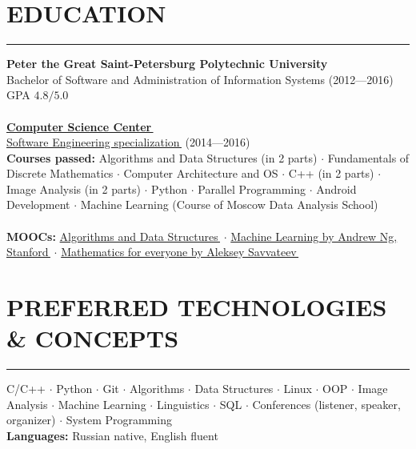 \documentclass[11pt]{res} %
\let\orighref\href
\renewcommand{\href}[2]{\orighref{#1}{#2\,\faExternalLink}}
\begin{document}
\begin{resume}
\section{\uppercase{Education}} 
\begin{spacing}{0.3}
\textcolor[RGB]{220,220,220}{\rule{\linewidth}{0.4pt}} 
\end{spacing}
\noindent \textbf{Peter the Great Saint-Petersburg Polytechnic University} \\
Bachelor of Software and Administration of Information Systems (2012---2016) \\
GPA $4.8/5.0$ \\ \\ 
\textbf{\href{https://compscicenter.ru/about/}{Computer Science Center}} \\
\href{https://compscicenter.ru/users/801/}{Software Engineering specialization} (2014---2016) \\
\textbf{Courses passed:} Algorithms and Data Structures (in 2 parts) $\cdot$ Fundamentals of Discrete Mathematics $\cdot$ Computer Architecture and OS $\cdot$ C++ (in 2 parts) $\cdot$ Image Analysis (in 2 parts) $\cdot$ Python $\cdot$ Parallel Programming $\cdot$ Android Development $\cdot$ Machine Learning (Course of Moscow Data Analysis School) \\ \\ 
\noindent \textbf{MOOCs:} \href{https://stepik.org/certificate/c97c48eb77cd3edbf2b4cb8d1624930ffe87cb7c.pdf}{Algorithms and Data Structures} $\cdot$ \href{https://www.coursera.org/learn/machine-learning}{Machine Learning by Andrew Ng, Stanford} $\cdot$ \href{https://www.coursera.org/learn/matematika-dlya-vseh}{Mathematics for everyone by Aleksey Savvateev}

\section{\uppercase{Preferred technologies \& concepts}}
\begin{spacing}{0.3}
\textcolor[RGB]{220,220,220}{\rule{\linewidth}{0.4pt}} 
\end{spacing}
C/C++ $\cdot$ Python $\cdot$ Git $\cdot$ Algorithms $\cdot$ Data Structures $\cdot$ Linux $\cdot$ OOP $\cdot$ Image Analysis $\cdot$ Machine Learning $\cdot$ Linguistics $\cdot$ SQL $\cdot$ Conferences (listener, speaker, organizer) $\cdot$ System Programming \\
\textbf{Languages:} Russian native, English fluent

\end{resume}
\end{document}

